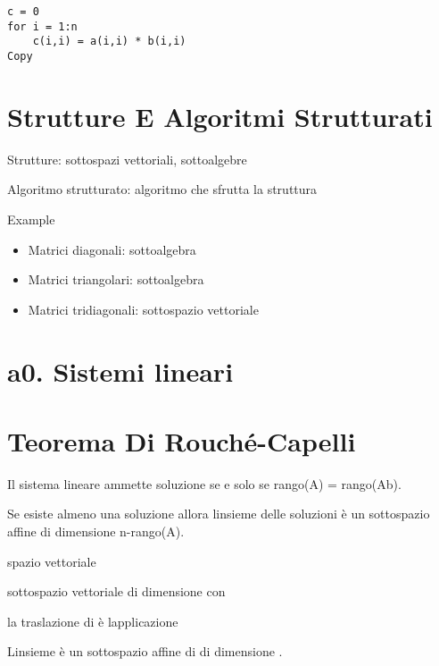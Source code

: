 \documentclass[
]{article}
\providecommand{\tightlist}{%
  \setlength{\itemsep}{0pt}\setlength{\parskip}{0pt}}
\begin{document}
\begin{verbatim}
c = 0
for i = 1:n
    c(i,i) = a(i,i) * b(i,i)
Copy
\end{verbatim}

\hypertarget{strutture-e-algoritmi-strutturati}{%
\section{Strutture E Algoritmi
Strutturati}\label{strutture-e-algoritmi-strutturati}}

Strutture: sottospazi vettoriali, sottoalgebre

Algoritmo strutturato: algoritmo che sfrutta la struttura

Example

\begin{itemize}
\tightlist
\item
  Matrici diagonali: sottoalgebra
\item
  Matrici triangolari: sottoalgebra
\item
  Matrici tridiagonali: sottospazio vettoriale
\end{itemize}

\hypertarget{a0.-sistemi-lineari}{%
\section{a0. Sistemi lineari}\label{a0.-sistemi-lineari}}

{}

{}

{}

\hypertarget{teorema-di-rouchuxe9-capelli}{%
\section{Teorema Di Rouché-Capelli}\label{teorema-di-rouchuxe9-capelli}}

Il sistema lineare {} ammette soluzione se e solo se rango(A) =
rango(A\textbar b).

Se esiste almeno una soluzione allora l\textquotesingle insieme delle
soluzioni è un sottospazio affine di dimensione n-rango(A).

{} spazio vettoriale

{} sottospazio vettoriale di dimensione {} con {}

{} la traslazione di {} è l\textquotesingle applicazione

{}

{}

L\textquotesingle insieme {} è un sottospazio affine di {} di dimensione
{}.
\end{document}
